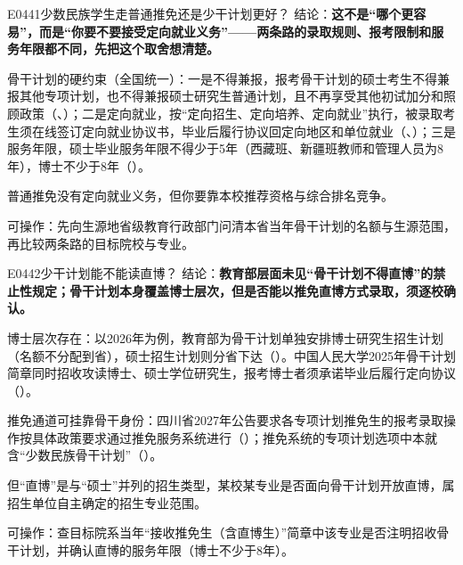 \begin{qa}{E0441}{少数民族学生走普通推免还是少干计划更好？}
结论：\textbf{这不是“哪个更容易”，而是“你要不要接受定向就业义务”——两条路的录取规则、报考限制和服务年限都不同，先把这个取舍想清楚。}

骨干计划的硬约束（全国统一）：一是不得兼报，报考骨干计划的硕士考生不得兼报其他专项计划，也不得兼报硕士研究生普通计划，且不再享受其他初试加分和照顾政策（、）；二是定向就业，按“定向招生、定向培养、定向就业”执行，被录取考生须在线签订定向就业协议书，毕业后履行协议回定向地区和单位就业（、）；三是服务年限，硕士毕业服务年限不得少于5年（西藏班、新疆班教师和管理人员为8年），博士不少于8年（）。

普通推免没有定向就业义务，但你要靠本校推荐资格与综合排名竞争。

可操作：先向生源地省级教育行政部门问清本省当年骨干计划的名额与生源范围，再比较两条路的目标院校与专业。
\end{qa}

\begin{qa}{E0442}{少干计划能不能读直博？}
结论：\textbf{教育部层面未见“骨干计划不得直博”的禁止性规定；骨干计划本身覆盖博士层次，但是否能以推免直博方式录取，须逐校确认。}

博士层次存在：以2026年为例，教育部为骨干计划单独安排博士研究生招生计划（名额不分配到省），硕士招生计划则分省下达（）。中国人民大学2025年骨干计划简章同时招收攻读博士、硕士学位研究生，报考博士者须承诺毕业后履行定向协议（）。

推免通道可挂靠骨干身份：四川省2027年公告要求各专项计划推免生的报考录取操作按具体政策要求通过推免服务系统进行（）；推免系统的专项计划选项中本就含“少数民族骨干计划”（）。

但“直博”是与“硕士”并列的招生类型，某校某专业是否面向骨干计划开放直博，属招生单位自主确定的招生专业范围。

可操作：查目标院系当年“接收推免生（含直博生）”简章中该专业是否注明招收骨干计划，并确认直博的服务年限（博士不少于8年）。
\end{qa}

